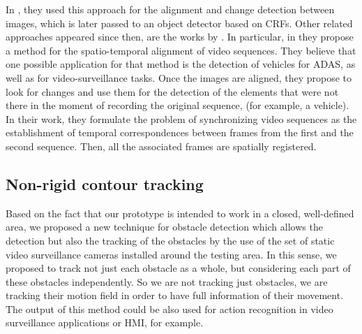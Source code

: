 In \cite{vallespi2012prior}, they used this approach for the alignment and change detection between images, which is later passed to an object detector based on \acp{CRF}. Other related approaches appeared since then, are the works by \cite{diego2011video, evangelidis2011slice, evangelidis2011efficient}. In particular, in \cite{diego2011video} they propose a method for the spatio-temporal alignment of video sequences. They believe that one possible application for that method is the detection of vehicles for \ac{ADAS}, as well as for video-surveillance tasks. Once the images are aligned, they propose to look for changes and use them for the detection of the elements that were not there in the moment of recording the original sequence, (for example, a vehicle). In their work, they formulate the problem of synchronizing video sequences as the establishment of temporal correspondences between frames from the first and the second sequence. Then, all the associated frames are spatially registered.

\subsection{Non-rigid contour tracking}\label{ch:chapter00_02_02}

Based on the fact that our prototype is intended to work in a closed, well-defined area, we proposed a new technique for obstacle detection which allows the detection but also the tracking of the obstacles by the use of the set of static video surveillance cameras installed around the testing area. In this sense, we proposed to track not just each obstacle as a whole, but considering each part of these obstacles independently. So we are not tracking just obstacles, we are tracking their motion field in order to have full information of their movement. The output of this method could be also used for action recognition in video surveillance applications or \ac{HMI}, for example.

